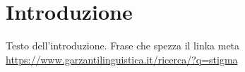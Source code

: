 \chapter*{Introduzione}
Testo dell'introduzione. Frase che spezza il linka meta
\url{https://www.garzantilinguistica.it/ricerca/?q=stigma}

